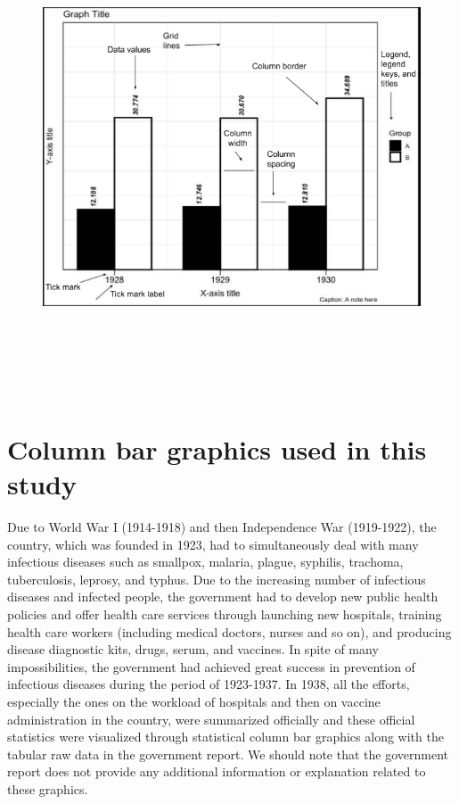 \begin{figure}[ht!]
	\centering
	\includegraphics[width=12cm,height=14cm,keepaspectratio]{deneme2.png}
	\label{fig:mylabelfanatomy}
\end{figure}


\section{Column bar graphics used in this study}
\label{sec:graphs}

Due to World War I (1914-1918) and then Independence War (1919-1922), the country, which was founded in 1923, had to simultaneously deal with many infectious diseases such as smallpox, malaria, plague, syphilis, trachoma, tuberculosis, leprosy, and typhus. Due to the increasing number of infectious diseases and infected people, the government had to develop new public health policies and offer health care services through launching new hospitals, training health care workers (including medical doctors, nurses and so on), and producing disease diagnostic kits, drugs, serum, and vaccines. In spite of many impossibilities, the government had achieved great success in prevention of infectious diseases during the period of 1923-1937. In 1938, all the efforts, especially the ones on the workload of hospitals and then on vaccine administration in the country, were summarized officially and these official statistics were visualized through statistical column bar graphics along with the tabular raw data in the government report. We should note that the government report does not provide any additional information or explanation related to these graphics. 

